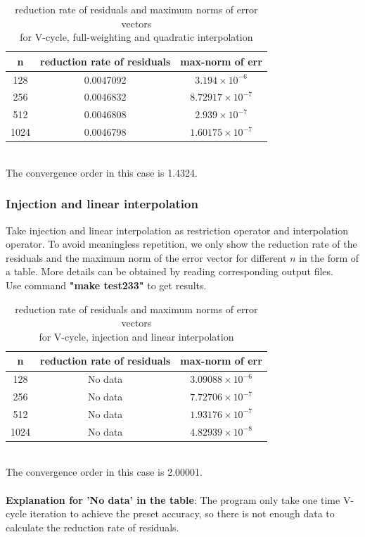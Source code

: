 \documentclass[a4paper,twocolumn]{article}
\theoremstyle{definition}
\begin{document}
\begin{table}[!htp]
	\centering
	\begin{tabular}{|c|c|c|}
		\hline	
		n & reduction rate of residuals & max-norm of err  \\
		\hline		
		128 &0.0047092 & $3.194\times 10^{-6}$ \\
		\hline		
		256 &0.0046832 & $8.72917\times 10^{-7}$ \\
		\hline		
		512 &0.0046808 & $2.939\times 10^{-7}$ \\
		\hline		
		1024 &0.0046798 & $1.60175\times 10^{-7}$ \\
		\hline
	\end{tabular}
	\caption{reduction rate of residuals and maximum norms of error vectors \\for V-cycle, full-weighting and quadratic interpolation}
\end{table}\\
The convergence order in this case is 1.4324.
\subsubsection{Injection and linear interpolation}
Take injection and linear interpolation as restriction operator and interpolation operator. To avoid meaningless repetition, we only show the reduction rate of the residuals and the maximum norm of the error vector for different $n$ in the form of a table. More details can be obtained by reading corresponding output files.\\
Use command \textbf{"make test233"} to get results. \\
\begin{table}[!htp]
	\centering
	\begin{tabular}{|c|c|c|}
		\hline	
		n &reduction rate of residuals & max-norm of err \\
		\hline		
		128 &No data& $3.09088\times 10^{-6}$ \\
		\hline		
		256 &No data& $7.72706\times 10^{-7}$ \\
		\hline		
		512 &No data& $1.93176\times 10^{-7}$ \\
		\hline		
		1024 &No data& $4.82939\times 10^{-8}$ \\
		\hline
	\end{tabular}
	\caption{reduction rate of residuals and maximum norms of error vectors \\for V-cycle, injection and linear interpolation}
\end{table}\\
The convergence order in this case is 2.00001.\\\\
\textbf{Explanation for 'No data' in the table}: The program only take one time V-cycle iteration to achieve the preset accuracy, so there is not enough data to calculate the reduction rate of residuals.
\newpage
\end{document}
